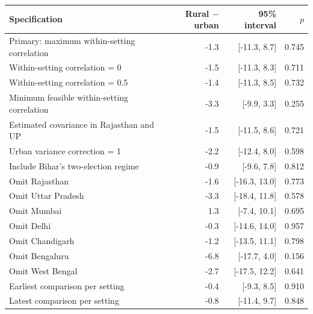 \begin{tabular}{lrrr}
\toprule
Specification & Rural $-$ urban & 95\% interval & $p$ \\
\midrule
Primary: maximum within-setting correlation & -1.3 & [-11.3, 8.7] & 0.745 \\
Within-setting correlation = 0 & -1.5 & [-11.3, 8.3] & 0.711 \\
Within-setting correlation = 0.5 & -1.4 & [-11.3, 8.5] & 0.732 \\
Minimum feasible within-setting correlation & -3.3 & [-9.9, 3.3] & 0.255 \\
Estimated covariance in Rajasthan and UP & -1.5 & [-11.5, 8.6] & 0.721 \\
Urban variance correction = 1 & -2.2 & [-12.4, 8.0] & 0.598 \\
Include Bihar's two-election regime & -0.9 & [-9.6, 7.8] & 0.812 \\
Omit Rajasthan & -1.6 & [-16.3, 13.0] & 0.773 \\
Omit Uttar Pradesh & -3.3 & [-18.4, 11.8] & 0.578 \\
Omit Mumbai & 1.3 & [-7.4, 10.1] & 0.695 \\
Omit Delhi & -0.3 & [-14.6, 14.0] & 0.957 \\
Omit Chandigarh & -1.2 & [-13.5, 11.1] & 0.798 \\
Omit Bengaluru & -6.8 & [-17.7, 4.0] & 0.156 \\
Omit West Bengal & -2.7 & [-17.5, 12.2] & 0.641 \\
Earliest comparison per setting & -0.4 & [-9.3, 8.5] & 0.910 \\
Latest comparison per setting & -0.8 & [-11.4, 9.7] & 0.848 \\
\bottomrule
\end{tabular}
